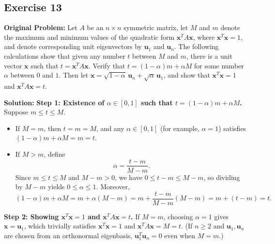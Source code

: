 \documentclass[11pt, letterpaper]{article}
\theoremstyle{definition}
\theoremstyle{remark}
\begin{document}
\subsection{Exercise 13}
\textbf{Original Problem:} Let $A$ be an $n \times n$ symmetric matrix, let $M$ and $m$ denote the maximum and minimum values of the quadratic form $\mathbf{x}^T A \mathbf{x}$, where $\mathbf{x}^T \mathbf{x} = 1$, and denote corresponding unit eigenvectors by $\mathbf{u}_1$ and $\mathbf{u}_n$. The following calculations show that given any number $t$ between $M$ and $m$, there is a unit vector $\mathbf{x}$ such that $t = \mathbf{x}^T A \mathbf{x}$. Verify that $t = (1 - \alpha)m + \alpha M$ for some number $\alpha$ between $0$ and $1$. Then let $\mathbf{x} = \sqrt{1 - \alpha}\,\mathbf{u}_n + \sqrt{\alpha}\,\mathbf{u}_1$, and show that $\mathbf{x}^T \mathbf{x} = 1$ and $\mathbf{x}^T A \mathbf{x} = t$.

\textbf{Solution:}
\textbf{Step 1: Existence of $\alpha \in [0, 1]$ such that $t = (1 - \alpha)m + \alpha M$.}
Suppose $m \le t \le M$.
\begin{itemize}
    \item If $M = m$, then $t = m = M$, and any $\alpha \in [0, 1]$ (for example, $\alpha = 1$) satisfies $(1 - \alpha)m + \alpha M = m = t$.
    \item If $M > m$, define
    \[
    \alpha = \frac{t - m}{M - m}.
    \]
    Since $m \le t \le M$ and $M - m > 0$, we have $0 \le t - m \le M - m$, so dividing by $M - m$ yields $0 \le \alpha \le 1$. Moreover,
    \[
    (1 - \alpha)m + \alpha M = m + \alpha(M - m) = m + \frac{t - m}{M - m}(M - m) = m + (t - m) = t.
    \]
\end{itemize}

\textbf{Step 2: Showing $\mathbf{x}^T \mathbf{x} = 1$ and $\mathbf{x}^T A \mathbf{x} = t$.}
If $M = m$, choosing $\alpha = 1$ gives $\mathbf{x} = \mathbf{u}_1$, which trivially satisfies $\mathbf{x}^T\mathbf{x} = 1$ and $\mathbf{x}^T A \mathbf{x} = M = t$. (If $n \ge 2$ and $\mathbf{u}_1, \mathbf{u}_n$ are chosen from an orthonormal eigenbasis, $\mathbf{u}_1^T\mathbf{u}_n = 0$ even when $M = m$.)
\end{document}
